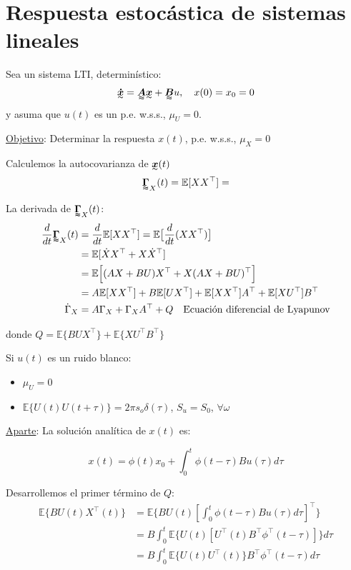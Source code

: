 \section{Respuesta estocástica de sistemas lineales}
Sea un sistema LTI, determinístico:
\begin{align*}
    \tend{\dot{x}} =\tenq{A}\tend{x}+\tenq{B}u, \quad x(0)=x_0=0
\end{align*}
y asuma que $u(t)$ es un p.e. w.s.s., $\mu_U=0$.
\par \underline{Objetivo}: Determinar la respuesta $x(t)$, p.e. w.s.s., $\mu_X=0$\\
\par Calculemos la autocovarianza de $\tend{x}(t)$
\begin{align*}
    \tenq{\Gamma}_X(t)=\mathbb{E}[XX^\top]=
\end{align*}

La derivada de $\tenq{\Gamma}_X(t)$:
\begin{align*}
    \frac{d}{dt}\tenq{\Gamma}_X(t)&=\frac{d}{dt}\mathbb{E}[XX^\top]=\mathbb{E}\bigl[\frac{d}{dt}(XX^\top)\bigr]\\
    &= \mathbb{E}[\dot{X}X^\top+X\dot{X}^\top]\\
    &= \mathbb{E}\Bigl[(AX+BU)X^\top+X(AX+BU)^\top\Bigr]\\
    &= A\mathbb{E}[XX^\top]+B\mathbb{E}[UX^\top]+\mathbb{E}[XX^\top]A^\top+\mathbb{E}[XU^\top]B^\top\\
    \dot{\Gamma}_X &= A\Gamma_X+\Gamma_XA^\top+Q \quad \text{Ecuación diferencial de Lyapunov}
\end{align*}


donde $Q=\mathbb{E}\{BUX^\top\}+\mathbb{E}\{XU^\top B^\top\}$\\

\par Si $u(t)$ es un ruido blanco: 
\begin{itemize}
    \item $\mu_U=0$
    \item $\mathbb{E}\{U(t)U(t+\tau)\}=2\pi s_o\delta (\tau)$, $S_u=S_0$, $\forall \omega$
\end{itemize}

\underline{Aparte}: La solución analítica de $x(t)$ es:

\begin{equation*}
    x(t)=\phi(t)x_0+\int_0^t \phi(t-\tau)Bu(\tau)d\tau
\end{equation*}

Desarrollemos el primer término de $Q$:
\begin{align*}
    \mathbb{E}\{BU(t)X^\top (t)\} &=  \mathbb{E}\{BU(t)[\int_0^t \phi(t-\tau)Bu(\tau)d\tau]^\top\}\\
    &= B\int_0^t \mathbb{E}\{U(t)[U^\top (t) B^\top \phi^\top (t-\tau)] \} d\tau\\
    &= B\int_0^t \mathbb{E}\{U(t)U^\top (t)\} B^\top \phi^\top (t-\tau) d\tau
\end{align*}

